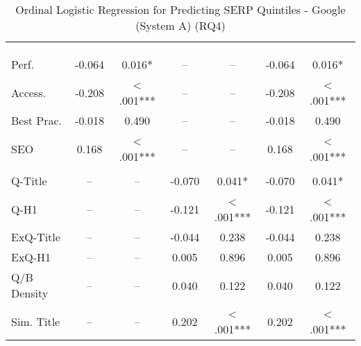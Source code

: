 \begin{table}[htbp!] 
\centering
\caption{Ordinal Logistic Regression for Predicting SERP Quintiles - Google (System A) (RQ4)}
\label{app:rq4_regression_google}
\small 
\setlength{\tabcolsep}{3pt}
\renewcommand{\arraystretch}{1}
\begin{threeparttable}
\begin{tabular*}{\textwidth}{l@{\extracolsep{\fill}} S[table-format=-1.3,table-space-text-post={***}] S[table-format=1.3,table-comparator=true,table-space-text-post={***}] S[table-format=-1.3,table-space-text-post={***}] S[table-format=1.3,table-comparator=true,table-space-text-post={***}] S[table-format=-1.3,table-space-text-post={***}] S[table-format=1.3,table-comparator=true,table-space-text-post={***}]}
\toprule
&  &  &  \\
\cmidrule(lr){2-3} \cmidrule(lr){4-5} \cmidrule(lr){6-7}
 & {} & {} & {} & {} & {} & {} \\
\dmidrule
{} & & & & & & \\
Perf. & -0.064 & 0.016* &  &  & -0.064 & 0.016* \\
Access. & -0.208 & < .001*** &  &  & -0.208 & < .001*** \\
Best Prac. & -0.018 & 0.490 &  &  & -0.018 & 0.490 \\
SEO & 0.168 & < .001*** &  &  & 0.168 & < .001*** \\
\midrule
{} & & & & & & \\
Q-Title &  &  & -0.070 & 0.041* & -0.070 & 0.041* \\
Q-H1 &  &  & -0.121 & < .001*** & -0.121 & < .001*** \\
ExQ-Title &  &  & -0.044 & 0.238 & -0.044 & 0.238 \\
ExQ-H1 &  &  & 0.005 & 0.896 & 0.005 & 0.896 \\
Q/B Density &  &  & 0.040 & 0.122 & 0.040 & 0.122 \\
Sim. Title &  &  & 0.202 & < .001*** & 0.202 & < .001*** \\

\end{tabular*}
\end{threeparttable}
\end{table}
